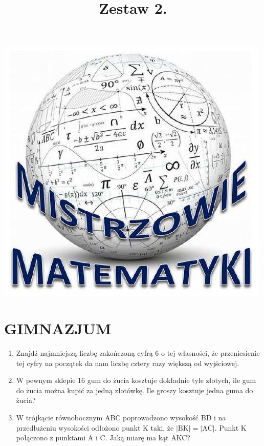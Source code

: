 \documentclass[10pt]{article}
\title{Zestaw 2. }
\author{}
\date{}
\begin{document}
\maketitle
\begin{center}
\includegraphics[max width=\textwidth]{2024_11_21_2f6840cbb6136169e919g-1(1)}
\end{center}

\section*{GIMNAZJUM}
\begin{enumerate}
  \item Znajdź najmniejszą liczbę zakończoną cyfrą 6 o tej własności, że przeniesienie tej cyfry na początek da nam liczbę cztery razy większą od wyjściowej.
  \item W pewnym sklepie 16 gum do żucia kosztuje dokładnie tyle złotych, ile gum do żucia można kupić za jedną złotówkę. Ile groszy kosztuje jedna guma do żucia?
  \item W trójkącie równobocznym ABC poprowadzono wysokość BD i na przedłużeniu wysokości odłożono punkt K taki, że \(|\mathrm{BK}|=|\mathrm{AC}|\). Punkt K połączono z punktami A i C. Jaką miarę ma kąt AKC?
\end{enumerate}
\end{document}
